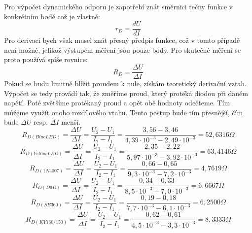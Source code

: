 \documentclass[12pt]{article} %
\begin{document}
Pro výpočet dynamického odporu je zapotřebí znát směrnici tečny funkce v konkrétním bodě což je vlastně:
\begin{equation}
r_D=\frac{dU}{dI}
\end{equation}
Pro derivaci bych však musel znát přesný předpis funkce, což v tomto případě není možné, jelikož výstupem měření jsou pouze body. Pro skutečné měření se proto používá spíše rovnice:
\begin{equation}
R_D=\frac{\Delta U}{\Delta I}
\end{equation}
Pokud se budu limitně blížit proudem k nule, získám teoretický derivační vztah. Výpočet se tedy provádí tak, že změříme proud, který protéká diodou při daném napětí. Poté zvětšíme protékaný proud a opět obě hodnoty odečteme. Tím můžeme využít onoho rozdílového vtahu. Tento postup bude tím přesnější, čím bude $\Delta U$ resp. $\Delta I$ menší.
\begin{equation}
R_{D(BlueLED)}=\frac{\Delta U}{\Delta I}=\frac{U_2-U_1}{I_2-I_1}=\frac{3,56-3,46}{4,39\cdot 10^{-3}-2,49\cdot 10^{-3}}=52,6316\Omega
\end{equation}
\begin{equation}
R_{D(YellowLED)}=\frac{\Delta U}{\Delta I}=\frac{U_2-U_1}{I_2-I_1}=\frac{2,35-2,22}{5,97\cdot 10^{-3}-3,92\cdot 10^{-3}}=63,4146\Omega
\end{equation}
\begin{equation}
R_{D(1N4007)}=\frac{\Delta U}{\Delta I}=\frac{U_2-U_1}{I_2-I_1}=\frac{0,66-0,65}{9,3\cdot 10^{-3}-7,2\cdot 10^{-3}}=4,7619\Omega
\end{equation}
\begin{equation}
R_{D(D9D)}=\frac{\Delta U}{\Delta I}=\frac{U_2-U_1}{I_2-I_1}=\frac{0,34-0,33}{8,5\cdot 10^{-3}-7,0\cdot 10^{-3}}=6,6667\Omega
\end{equation}
\begin{equation}
R_{D(SB 360)}=\frac{\Delta U}{\Delta I}=\frac{U_2-U_1}{I_2-I_1}=\frac{0,19-0,18}{7,7\cdot 10^{-3}-6,1\cdot 10^{-3}}=6,2500\Omega
\end{equation}
\begin{equation}
R_{D(KY 130/150)}=\frac{\Delta U}{\Delta I}=\frac{U_2-U_1}{I_2-I_1}=\frac{0,62-0,61}{4,5\cdot 10^{-3}-3,3\cdot 10^{-3}}=8,3333\Omega
\end{equation}
\end{document}
